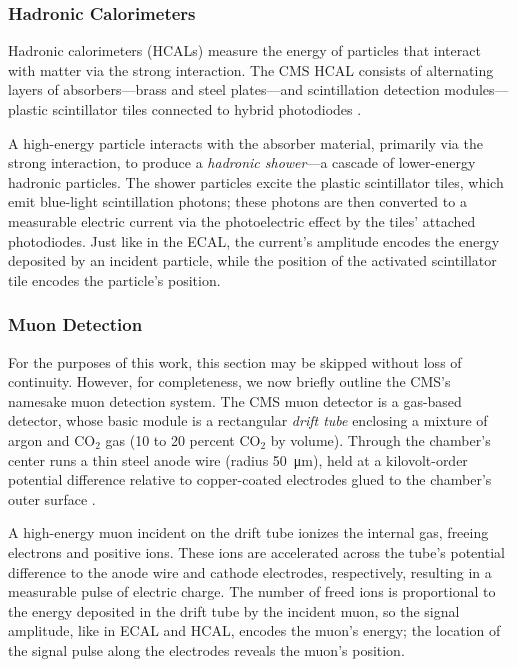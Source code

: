 \documentclass[11pt, a4paper]{article}
\newcommand{\chem}[1]{\ensuremath{\mathrm{#1}}}  %
\begin{document}
\subsubsection{Hadronic Calorimeters}
Hadronic calorimeters (HCALs) measure the energy of particles that interact with matter via the strong interaction.
The CMS HCAL consists of alternating layers of absorbers---brass and steel plates---and scintillation detection modules---plastic scintillator tiles connected to hybrid photodiodes \cite{hcal-tdr}.

A high-energy particle interacts with the absorber material, primarily via the strong interaction, to produce a \textit{hadronic shower}---a cascade of lower-energy hadronic particles.
The shower particles excite the plastic scintillator tiles, which emit blue-light scintillation photons; these photons are then converted to a measurable electric current via the photoelectric effect by the tiles' attached photodiodes.
Just like in the ECAL, the current's amplitude encodes the energy deposited by an incident particle, while the position of the activated scintillator tile encodes the particle's position.

\subsubsection{Muon Detection}
For the purposes of this work, this section may be skipped without loss of continuity.
However, for completeness, we now briefly outline the CMS's namesake muon detection system.
The CMS muon detector is a gas-based detector, whose basic module is a rectangular \textit{drift tube} enclosing a mixture of argon and \chem{CO_2} gas (10 to 20 percent \chem{CO_2} by volume).
Through the chamber's center runs a thin steel anode wire (radius \SI{50}{\micro \meter}), held at a kilovolt-order potential difference relative to copper-coated electrodes glued to the chamber's outer surface \cite{muon-tdr}.

A high-energy muon incident on the drift tube ionizes the internal gas, freeing electrons and positive ions.
These ions are accelerated across the tube's potential difference to the anode wire and cathode electrodes, respectively, resulting in a measurable pulse of electric charge.
The number of freed ions is proportional to the energy deposited in the drift tube by the incident muon, so the signal amplitude, like in ECAL and HCAL, encodes the muon's energy; the location of the signal pulse along the electrodes reveals the muon's position.
\end{document}
